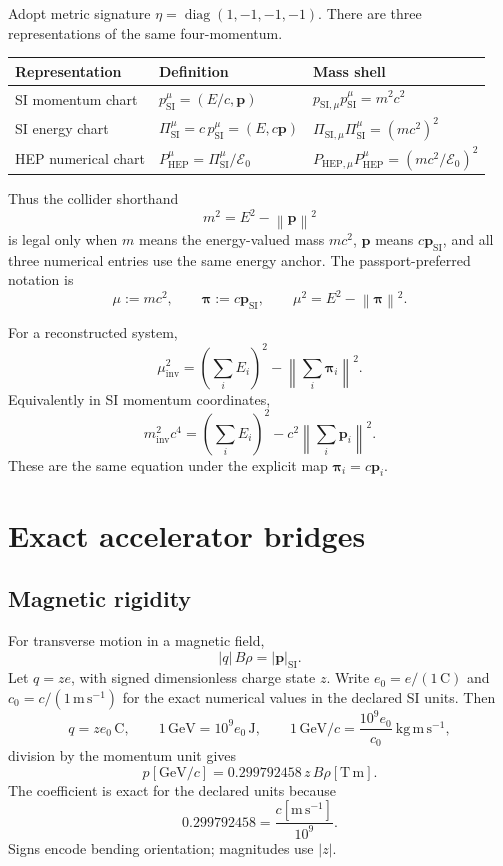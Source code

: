 \documentclass[11pt,a4paper]{article}
\theoremstyle{definition}
\theoremstyle{plain}
\theoremstyle{remark}
\newcommand{\abs}[1]{\left\lvert #1\right\rvert}
\newcommand{\norm}[1]{\left\lVert #1\right\rVert}
\newcommand{\Ezero}{\mathcal E_0}
\newcommand{\GeV}{\mathrm{GeV}}
\newcommand{\SI}{\mathrm{SI}}
\newcommand{\HEP}{\mathrm{HEP}}
\begin{document}
Adopt metric signature \(\eta=\operatorname{diag}(1,-1,-1,-1)\).
There are three representations of the same four-momentum.

\begin{longtable}{@{}L{36mm}L{55mm}L{55mm}@{}}
\toprule
Representation & Definition & Mass shell \\
\midrule
\endhead
SI momentum chart &
\(p^\mu_{\SI}=(E/c,\bm p)\) &
\(p_{\SI,\mu}p^\mu_{\SI}=m^2c^2\) \\
SI energy chart &
\(\Pi^\mu_{\SI}=c\,p^\mu_{\SI}=(E,c\bm p)\) &
\(\Pi_{\SI,\mu}\Pi^\mu_{\SI}=(mc^2)^2\) \\
HEP numerical chart &
\(P^\mu_{\HEP}=\Pi^\mu_{\SI}/\Ezero\) &
\(P_{\HEP,\mu}P^\mu_{\HEP}=(mc^2/\Ezero)^2\) \\
\bottomrule
\end{longtable}

Thus the collider shorthand
\[
m^2=E^2-\norm{\bm p}^2
\]
is legal only when \(m\) means the energy-valued mass \(mc^2\),
\(\bm p\) means \(c\bm p_{\SI}\), and all three numerical entries use
the same energy anchor. The passport-preferred notation is
\[
\mu:=mc^2,\qquad \bm\pi:=c\bm p_{\SI},\qquad
\mu^2=E^2-\norm{\bm\pi}^2.
\]

For a reconstructed system,
\[
\mu_{\mathrm{inv}}^2
=
\left(\sum_i E_i\right)^2
-\left\lVert\sum_i\bm\pi_i\right\rVert^2.
\]
Equivalently in SI momentum coordinates,
\[
m_{\mathrm{inv}}^2c^4
=
\left(\sum_i E_i\right)^2
-c^2\left\lVert\sum_i\bm p_i\right\rVert^2.
\]
These are the same equation under the explicit map
\(\bm\pi_i=c\bm p_i\).

\section{Exact accelerator bridges}

\subsection{Magnetic rigidity}

For transverse motion in a magnetic field,
\[
\abs{q}\,B\rho=\abs{\bm p}_{\SI}.
\]
Let \(q=ze\), with signed dimensionless charge state \(z\).
Write \(e_0=e/(1\,\mathrm C)\) and
\(c_0=c/(1\,\mathrm{m\,s^{-1}})\) for the exact numerical values in
the declared SI units. Then
\[
q=z e_0\,\mathrm C,\qquad
1\,\GeV=10^9e_0\,\mathrm J,\qquad
1\,\GeV/c=\frac{10^9e_0}{c_0}\ \mathrm{kg\,m\,s^{-1}},
\]
division by the momentum unit gives
\[
\boxed{
p[\GeV/c]=0.299792458\,z\,B\rho[\mathrm{T\,m}].
}
\]
The coefficient is exact for the declared units because
\[
0.299792458=\frac{c[\mathrm{m\,s^{-1}}]}{10^9}.
\]
Signs encode bending orientation; magnitudes use \(\abs z\).
\end{document}
